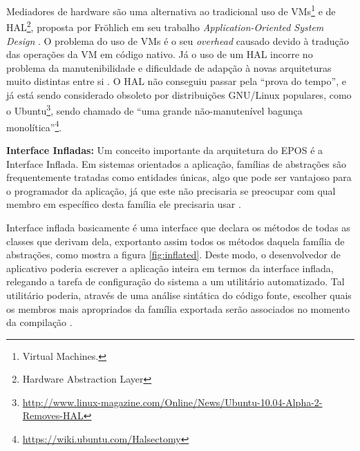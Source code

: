 Mediadores de hardware são uma alternativa ao tradicional uso de VMs\footnote{Virtual Machines.} e de HAL\footnote{Hardware Abstraction Layer}, proposta por Fröhlich em seu trabalho \emph{Application-Oriented System Design} \cite{guto_thesis}. O problema do uso de VMs é o seu \emph{overhead} causado devido à tradução das operações da VM em código nativo. Já o uso de um HAL incorre no problema da manutenibilidade e dificuldade de adapção à novas arquiteturas muito distintas entre si \cite{hw_mediators}. O HAL não conseguiu passar pela ``prova do tempo'', e já está sendo considerado obsoleto por distribuições GNU/Linux populares, como o 
Ubuntu\footnote{\url{http://www.linux-magazine.com/Online/News/Ubuntu-10.04-Alpha-2-Removes-HAL}}, sendo chamado de ``uma grande não-manutenível bagunça monolítica''\footnote{\url{https://wiki.ubuntu.com/Halsectomy}}.


\textbf{Interface Infladas: } Um conceito importante da arquitetura do EPOS é a Interface Inflada. %
Em sistemas orientados a aplicação, famílias de abstrações são frequentemente tratadas como entidades únicas, algo que pode ser vantajoso para o programador da aplicação, já que este não precisaria se preocupar com qual membro em específico desta família ele precisaria usar \cite{guto_thesis}.

Interface inflada basicamente é uma interface que declara os métodos de todas as classes que derivam dela, exportanto assim todos os métodos daquela família de abstrações, como mostra a figura \ref{fig:inflated}. Deste modo, o desenvolvedor de aplicativo poderia escrever a aplicação inteira em termos da interface inflada, relegando a tarefa de configuração do sistema a um utilitário automatizado. Tal utilitário poderia, através de uma análise sintática do código fonte, escolher quais os membros mais apropriados da família exportada serão associados no momento da compilação \cite[p.~56]{guto_thesis}.


